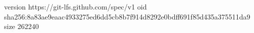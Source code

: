 version https://git-lfs.github.com/spec/v1
oid sha256:8a83ae9eaac4933275ed6dd5cb8b7f914d8292e0bdff691f85d435a375511da9
size 262240
